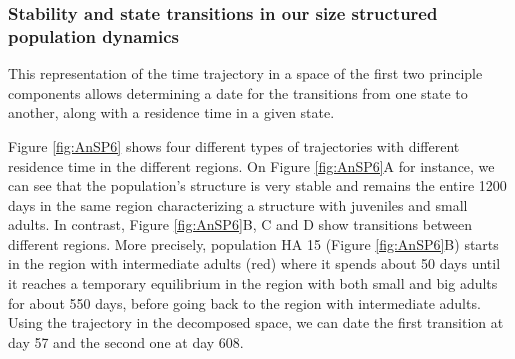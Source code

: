 \subsubsection{Stability and state transitions in our size structured
population dynamics}

This representation of the time trajectory in a space of the first two principle
components allows determining a date for the transitions from one state to
another, along with a residence time in a given state.

Figure \ref{fig:AnSP6} shows four different types of trajectories with different residence
time in the different regions. On Figure \ref{fig:AnSP6}A for instance, we can see that the
population’s structure is very stable and remains the entire 1200 days in the
same region characterizing a structure with juveniles and small adults. In
contrast, Figure \ref{fig:AnSP6}B, C and D show transitions between different regions. More
precisely, population HA 15 (Figure \ref{fig:AnSP6}B) starts in the region with intermediate
adults (red) where it spends about 50 days until it reaches a temporary
equilibrium in the region with both small and big adults for about 550 days,
before going back to the region with intermediate adults. Using the trajectory
in the decomposed space, we can date the first transition at day 57 and the
second one at day 608.

